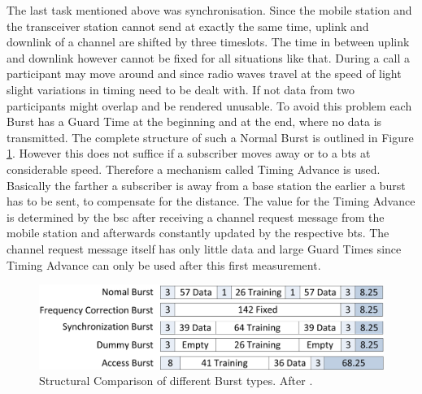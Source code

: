 The last task mentioned above was synchronisation.
Since the mobile station and the transceiver station cannot send at exactly the same time, uplink and downlink of a channel are shifted by three timeslots.
The time in between uplink and downlink however cannot be fixed for all situations like that.
During a call a participant may move around and since radio waves travel at the speed of light slight variations in timing need to be dealt with.
If not data from two participants might overlap and be rendered unusable.
To avoid this problem each Burst has a Guard Time at the beginning and at the end, where no data is transmitted.
The complete structure of such a Normal Burst is outlined in Figure \ref{fig:burst_types}.
However this does not suffice if a subscriber moves away or to a \gls{bts} at considerable speed.
Therefore a mechanism called Timing Advance is used.
Basically the farther a subscriber is away from a base station the earlier a burst has to be sent, to compensate for the distance.
The value for the Timing Advance is determined by the \gls{bsc} after receiving a channel request message from the mobile station and afterwards constantly updated by the respective \gls{bts}.
The channel request message itself has only little data and large Guard Times since Timing Advance can only be used after this first measurement.

\begin{figure}
	\centering
	\includegraphics{../Images/Bursts}
	\caption{Structural Comparison of different Burst types. After \cite{GSM2009}.}
	\label{fig:burst_types}
\end{figure}

